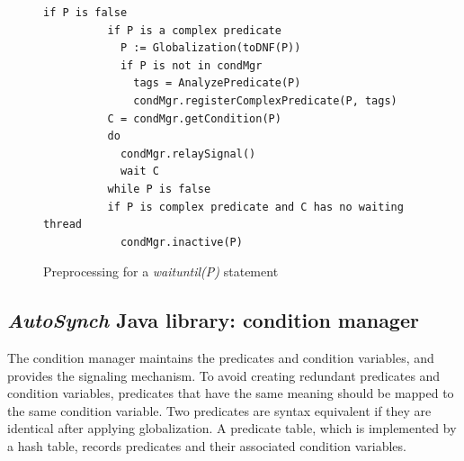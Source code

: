 \documentclass{sigplanconf}
\begin{document}
\begin{figure}[ht!]
    \begin{Verbatim}[fontsize=\footnotesize,gobble=8,frame=lines,
            framesep=3mm]
        if P is false 
          if P is a complex predicate 
            P := Globalization(toDNF(P))
            if P is not in condMgr
              tags = AnalyzePredicate(P)
              condMgr.registerComplexPredicate(P, tags)
          C = condMgr.getCondition(P)
          do 
            condMgr.relaySignal()
            wait C
          while P is false
          if P is complex predicate and C has no waiting thread
            condMgr.inactive(P) 
    \end{Verbatim}
    \caption{Preprocessing for a {\em waituntil(P)} statement}
  \label{fig:prep}
\end{figure}  


%
%


\subsection{{\em AutoSynch} Java library: condition manager}
The condition manager maintains the predicates and condition variables, and
provides the signaling mechanism. To avoid creating redundant predicates and 
condition variables, predicates that have the same meaning should be mapped to 
the same condition variable. Two predicates are syntax equivalent if they 
are identical after applying globalization. A predicate table, which is implemented by a
hash table, records predicates and their associated condition variables. 
\end{document}
